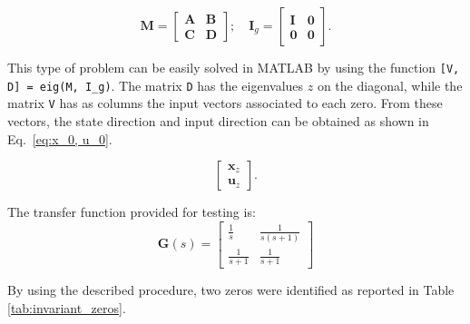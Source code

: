 \documentclass{scrreprt}
\begin{document}
\begin{equation}
  \boldsymbol{M} = \begin{bmatrix} \boldsymbol{A} & \boldsymbol{B} \\ \boldsymbol{C} & \boldsymbol{D} \end{bmatrix}; \quad \boldsymbol{I}_g = \begin{bmatrix} \boldsymbol{I} & \boldsymbol{0} \\ \boldsymbol{0} & \boldsymbol{0} \end{bmatrix} \text{.}
  \label{eq:M, I_g}
\end{equation}

This type of problem can be easily solved in MATLAB by using the function \texttt{[V, D] = eig(M, I\_g)}. The matrix \texttt{D} has the eigenvalues $z$ on the diagonal, while the matrix \texttt{V} has as columns the input vectors associated to each zero. From these vectors, the state direction and input direction can be obtained as shown in Eq.~\eqref{eq:x_0, u_0}.

\begin{equation}
  \begin{bmatrix} \boldsymbol{x}_z \\ \boldsymbol{u}_z \end{bmatrix} \text{.}
  \label{eq:x_0, u_0}
\end{equation}

The transfer function provided for testing is:
\begin{equation}
  \boldsymbol{G}(s) = \begin{bmatrix} \frac{1}{s} & \frac{1}{s(s+1)} \\ \frac{1}{s+1} & \frac{1}{s+1} \end{bmatrix}
  \label{eq:G(s)}
\end{equation}

By using the described procedure, two zeros were identified as reported in Table \ref{tab:invariant_zeros}.
\end{document}
